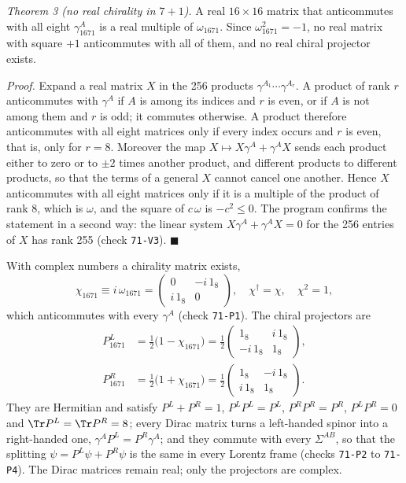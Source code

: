 \emph{Theorem 3 (no real chirality in $7+1$).} A real $16\times16$ matrix that anticommutes with all
eight $\gamma_{1671}^A$ is a real multiple of $\omega_{1671}$. Since $\omega_{1671}^2=-1$, no real
matrix with square $+1$ anticommutes with all of them, and no real chiral projector exists.

\emph{Proof.} Expand a real matrix $X$ in the 256 products $\gamma^{A_1}\cdots\gamma^{A_r}$. A product
of rank $r$ anticommutes with $\gamma^A$ if $A$ is among its indices and $r$ is even, or if $A$ is not
among them and $r$ is odd; it commutes otherwise. A product therefore anticommutes with all eight
matrices only if every index occurs and $r$ is even, that is, only for $r=8$. Moreover the map
$X\mapsto X\gamma^A+\gamma^AX$ sends each product either to zero or to $\pm2$ times another product,
and different products to different products, so that the terms of a general $X$ cannot cancel one
another. Hence $X$ anticommutes with all eight matrices only if it is a multiple of the product of
rank 8, which is $\omega$, and the square of $c\,\omega$ is $-c^2\le0$. The program confirms the
statement in a second way: the linear system $X\gamma^A+\gamma^AX=0$ for the 256 entries of $X$ has
rank 255 (check \texttt{71-V3}). $\blacksquare$

With complex numbers a chirality matrix exists,
\begin{equation}
\chi_{1671}\equiv i\,\omega_{1671}=\begin{pmatrix}0&-i\,1_8\\ i\,1_8&0\end{pmatrix},\quad\chi^\dagger=\chi,\quad\chi^2=1,
\label{eq:chi}
\end{equation}
which anticommutes with every $\gamma^A$ (check \texttt{71-P1}). The chiral projectors are
\begin{align}
P_{1671}^{L}&=\tfrac12\big(1-\chi_{1671}\big)=\tfrac12\begin{pmatrix}1_8&i\,1_8\\-i\,1_8&1_8\end{pmatrix},\nonumber\\
P_{1671}^{R}&=\tfrac12\big(1+\chi_{1671}\big)=\tfrac12\begin{pmatrix}1_8&-i\,1_8\\ i\,1_8&1_8\end{pmatrix}.
\label{eq:PLPR}
\end{align}
They are Hermitian and satisfy $P^{L}+P^{R}=1$, $P^{L}P^{L}=P^{L}$, $P^{R}P^{R}=P^{R}$,
$P^{L}P^{R}=0$ and $\Tr P^{L}=\Tr P^{R}=8$; every Dirac matrix turns a left-handed spinor into a
right-handed one, $\gamma^AP^{L}=P^{R}\gamma^A$; and they commute with every $\Sigma^{AB}$, so that the
splitting $\psi=P^{L}\psi+P^{R}\psi$ is the same in every Lorentz frame (checks \texttt{71-P2} to
\texttt{71-P4}). The Dirac matrices remain real; only the projectors are complex.

